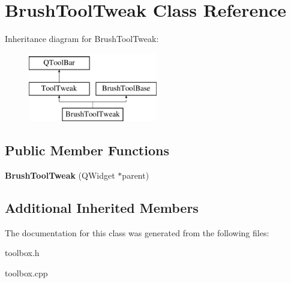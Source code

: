 \hypertarget{class_brush_tool_tweak}{\section{Brush\-Tool\-Tweak Class Reference}
\label{class_brush_tool_tweak}
}
Inheritance diagram for Brush\-Tool\-Tweak\-:\begin{figure}[H]
\begin{center}
\leavevmode
\includegraphics[height=3.000000cm]{class_brush_tool_tweak}
\end{center}
\end{figure}
\subsection*{Public Member Functions}
\begin{DoxyCompactItemize}
\item 
\hypertarget{class_brush_tool_tweak_aeed0fc50628c810b5a01ace5f28d50d7}{{\bfseries Brush\-Tool\-Tweak} (Q\-Widget $\ast$parent)}\label{class_brush_tool_tweak_aeed0fc50628c810b5a01ace5f28d50d7}

\end{DoxyCompactItemize}
\subsection*{Additional Inherited Members}


The documentation for this class was generated from the following files\-:\begin{DoxyCompactItemize}
\item 
toolbox.\-h\item 
toolbox.\-cpp\end{DoxyCompactItemize}
